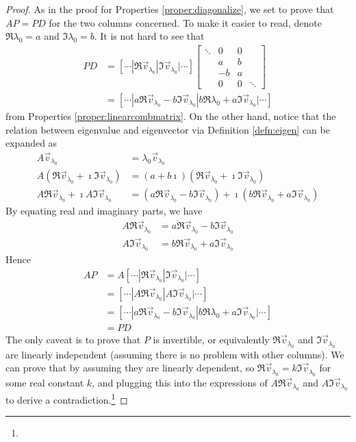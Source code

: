\begin{proof}
As in the proof for Properties \ref{proper:diagonalize}, we set to prove that $AP = PD$ for the two columns concerned. To make it easier to read, denote $\Re{\lambda_0} = a$ and $\Im{\lambda_0} = b$. It is not hard to see that
\begin{align*}
PD &=
[\cdots|\Re{\vec{v}_{\lambda_0}}|\Im{\vec{v}_{\lambda_0}}|\cdots]
\begin{bmatrix}
\ddots & 0 & 0 & \\
& a & b & \\
& -b & a & \\
& 0 & 0 & \ddots
\end{bmatrix} \\
&= [\cdots|a\Re{\vec{v}_{\lambda_0}} - b\Im{\vec{v}_{\lambda_0}} | b\Re{\lambda_0} + a\Im{\vec{v}_{\lambda_0}}|\cdots]
\end{align*}
from Properties \ref{proper:linearcombmatrix}. On the other hand, notice that the relation between eigenvalue and eigenvector via Definition \ref{defn:eigen} can be expanded as
\begin{align*}
A\vec{v}_{\lambda_0} &= \lambda_0\vec{v}_{\lambda_0} \\
A(\Re{\vec{v}_{\lambda_0}} + \imath \Im{\vec{v}_{\lambda_0}}) &= (a+b\imath)(\Re{\vec{v}_{\lambda_0}} + \imath \Im{\vec{v}_{\lambda_0}}) \\
A\Re{\vec{v}_{\lambda_0}} + \imath A\Im{\vec{v}_{\lambda_0}} &= (a\Re{\vec{v}_{\lambda_0}} - b\Im{\vec{v}_{\lambda_0}}) + \imath(b\Re{\vec{v}_{\lambda_0}} + a\Im{\vec{v}_{\lambda_0}})
\end{align*}
By equating real and imaginary parts, we have
\begin{align*}
A\Re{\vec{v}_{\lambda_0}} &= a\Re{\vec{v}_{\lambda_0}} - b\Im{\vec{v}_{\lambda_0}} \\
A\Im{\vec{v}_{\lambda_0}} &= b\Re{\vec{v}_{\lambda_0}} + a\Im{\vec{v}_{\lambda_0}}
\end{align*}
Hence
\begin{align*}
AP &= A[\cdots|\Re{\vec{v}_{\lambda_0}}|\Im{\vec{v}_{\lambda_0}}|\cdots] \\
&= [\cdots|A\Re{\vec{v}_{\lambda_0}}|A\Im{\vec{v}_{\lambda_0}}|\cdots] \\
&= [\cdots|a\Re{\vec{v}_{\lambda_0}} - b\Im{\vec{v}_{\lambda_0}} | b\Re{\lambda_0} + a\Im{\vec{v}_{\lambda_0}}|\cdots] \\
&= PD
\end{align*}
The only caveat is to prove that $P$ is invertible, or equivalently $\Re{\vec{v}_{\lambda_0}}$ and $\Im{\vec{v}_{\lambda_0}}$ are linearly independent (assuming there is no problem with other columns). We can prove that by assuming they are linearly dependent, so $\Re{\vec{v}_{\lambda_0}} = k\Im{\vec{v}_{\lambda_0}}$ for some real constant $k$, and plugging this into the expressions of $A\Re{\vec{v}_{\lambda_0}}$ and $A\Im{\vec{v}_{\lambda_0}}$ to derive a contradiction.\footnote{
}
\end{proof}
